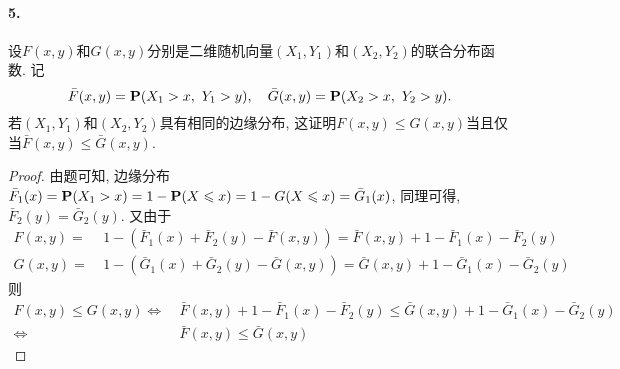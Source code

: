 \documentclass[12pt, a4paper, oneside]{ctexart}
\begin{document}
\paragraph{5.}设$F(x, y)$和$G(x,y)$分别是二维随机向量$(X_1,Y_1)$和$(X_2,Y_2)$的联合分布函数. 记\begin{equation*}
    \bar{F}(x, y) = \P(X_1 > x,\ Y_1 > y),\quad \bar{G}(x, y)=\P(X_2 > x,\ Y_2 > y).
\end{equation*}
若$(X_1,Y_1)$和$(X_2,Y_2)$具有相同的边缘分布, 这证明$F(x, y)\leqslant G(x, y)$当且仅当$\bar{F}(x, y)\leqslant \bar{G}(x, y).$
\begin{proof}
    由题可知, 边缘分布$\disp \bar{F}_1(x) = \P(X_1 > x) = 1-\P(X\leqslant x) = 1-G(X\leqslant x) = \bar{G}_1(x)$, 同理可得, $\bar{F}_2(y) = \bar{G}_2(y)$. 又由于
    \begin{equation*}
        \begin{aligned}
        F(x, y) =&\ 1 - (\bar{F}_1(x)+\bar{F}_2(y) - \bar{F}(x, y)) = \bar{F}(x, y) + 1 - \bar{F}_1(x) - \bar{F}_2(y)\\
        G(x, y) =&\ 1 - (\bar{G}_1(x)+\bar{G}_2(y) - \bar{G}(x, y)) = \bar{G}(x, y) + 1 - \bar{G}_1(x) - \bar{G}_2(y)
        \end{aligned}
    \end{equation*}
    则\begin{equation*}
        \begin{aligned}
            F(x, y)\leqslant G(x, y)\iff&\ \bar{F}(x, y) + 1 - \bar{F}_1(x) - \bar{F}_2(y)\leqslant \bar{G}(x, y) + 1 - \bar{G}_1(x) - \bar{G}_2(y)\\
            \iff&\ \bar{F}(x, y)\leqslant \bar{G}(x, y)
        \end{aligned}
    \end{equation*}
\end{proof}
\end{document}
